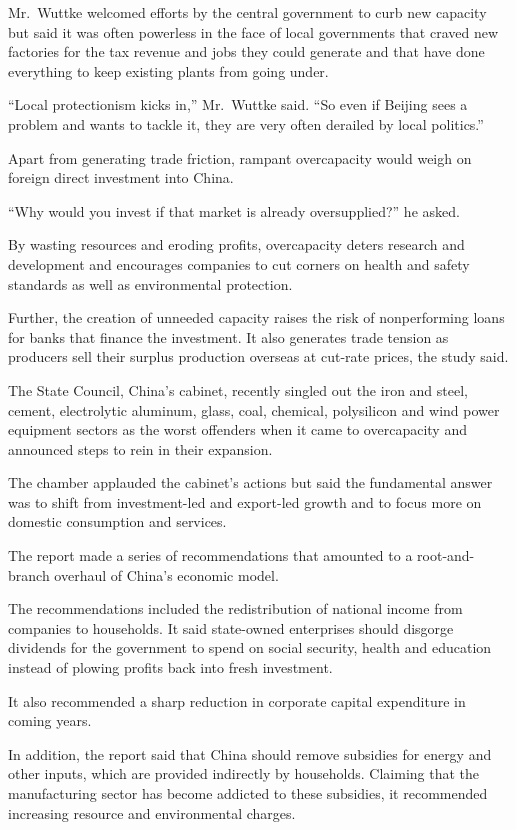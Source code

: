 ﻿\documentclass[12pt]{article}
\begin{document}
Mr.~Wuttke welcomed efforts by the central government to curb new capacity but said it was often
powerless in the face of local governments that craved new factories for the tax revenue and jobs
they could generate and that have done everything to keep existing plants from going under.

``Local protectionism kicks in,'' Mr.~Wuttke said. ``So even if Beijing sees a problem and wants to
tackle it, they are very often derailed by local politics.''

Apart from generating trade friction, rampant overcapacity would weigh on foreign direct investment
into China.

``Why would you invest if that market is already oversupplied?'' he asked.

By wasting resources and eroding profits, overcapacity deters research and development and
encourages companies to cut corners on health and safety standards as well as environmental
protection.

Further, the creation of unneeded capacity raises the risk of nonperforming loans for banks that
finance the investment. It also generates trade tension as producers sell their surplus production
overseas at cut-rate prices, the study said.

The State Council, China's cabinet, recently singled out the iron and steel, cement, electrolytic
aluminum, glass, coal, chemical, polysilicon and wind power equipment sectors as the worst offenders
when it came to overcapacity and announced steps to rein in their expansion.

The chamber applauded the cabinet's actions but said the fundamental answer was to shift from
investment-led and export-led growth and to focus more on domestic consumption and services.

The report made a series of recommendations that amounted to a root-and-branch overhaul of China's
economic model.

The recommendations included the redistribution of national income from companies to households. It
said state-owned enterprises should disgorge dividends for the government to spend on social
security, health and education instead of plowing profits back into fresh investment.

It also recommended a sharp reduction in corporate capital expenditure in coming years.

In addition, the report said that China should remove subsidies for energy and other inputs, which
are provided indirectly by households. Claiming that the manufacturing sector has become addicted to
these subsidies, it recommended increasing resource and environmental charges.
\end{document}
